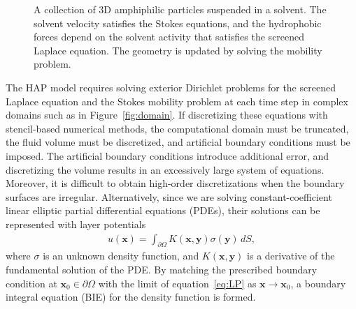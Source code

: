 \label{subsec:specific_aim_2}
\begin{figure}
    \vspace{-20pt}
    \caption{\label{fig:flow_map} \footnotesize A collection of 3D
    amphiphilic particles suspended in a solvent. The solvent velocity
    satisfies the Stokes equations, and the hydrophobic forces depend on
    the solvent activity that satisfies the screened Laplace equation.
    The geometry is updated by solving the mobility problem.} 
\end{figure}
The HAP model requires solving exterior Dirichlet problems for the
screened Laplace equation and the Stokes mobility problem at each time
step in complex domains such as in Figure~\ref{fig:domain}. If
discretizing these equations with stencil-based numerical methods, the
computational domain must be truncated, the fluid volume must be
discretized, and artificial boundary conditions must be imposed. The
artificial boundary conditions introduce additional error, and
discretizing the volume results in an excessively large system of
equations. Moreover, it is difficult to obtain high-order
discretizations when the boundary surfaces are irregular. Alternatively,
since we are solving constant-coefficient linear elliptic
partial differential equations (PDEs), their
solutions can be represented with layer potentials
\begin{align}
  \label{eq:LP}
  u(\mathbf{x}) = \int_{\partial\Omega} K(\mathbf{x},\mathbf{y})
  \sigma(\mathbf{y})\,dS,
\end{align}
where $\sigma$ is an unknown density function, and
$K(\mathbf{x},\mathbf{y})$ is a derivative of the fundamental solution
of the PDE. By matching the prescribed boundary condition at
$\mathbf{x}_0 \in \partial\Omega$ with the limit of
equation~\eqref{eq:LP} as $\mathbf{x}\rightarrow \mathbf{x}_0$, a
boundary integral equation (BIE) for the density function is formed. 


